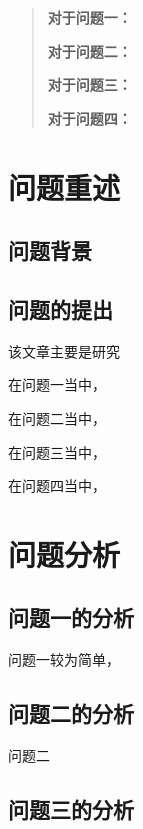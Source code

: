 \documentclass{cumcmthesis}
\title{}
\begin{document}
\maketitle
\begin{abstract}
	\par
	\textbf{对于问题一：}
	\par
	\textbf{对于问题二：}
	\par
	\textbf{对于问题三：}	\par
	\textbf{对于问题四：}	\par
\end{abstract}

\section{问题重述}
\subsection{问题背景}

\subsection{问题的提出}
该文章主要是研究
\par

\par
在问题一当中，
\par
在问题二当中，
\par
在问题三当中，
\par
在问题四当中，
\newpage
\section{问题分析}
\subsection{问题一的分析}
问题一较为简单，\par

\subsection{问题二的分析}
问题二
\subsection{问题三的分析}
\end{document}
